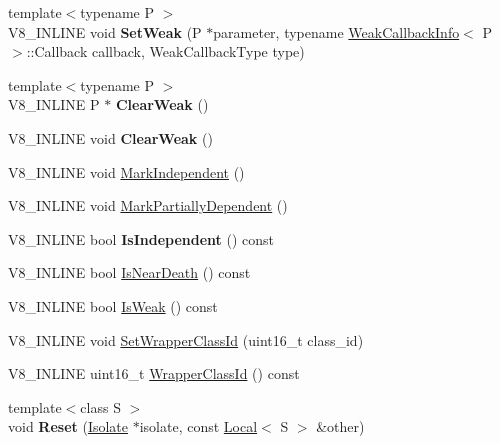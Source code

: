 \begin{DoxyCompactItemize}
\item 
\hypertarget{classv8_1_1PersistentBase_aebb8a2c97e219102f613ff3749c956f6}{}{\footnotesize template$<$typename P $>$ }\\V8\+\_\+\+I\+N\+L\+I\+N\+E void {\bfseries Set\+Weak} (P $\ast$parameter, typename \hyperlink{classv8_1_1WeakCallbackInfo}{Weak\+Callback\+Info}$<$ P $>$\+::Callback callback, Weak\+Callback\+Type type)\label{classv8_1_1PersistentBase_aebb8a2c97e219102f613ff3749c956f6}

\item 
\hypertarget{classv8_1_1PersistentBase_a444d27c00650e3663348024df08cb121}{}{\footnotesize template$<$typename P $>$ }\\V8\+\_\+\+I\+N\+L\+I\+N\+E P $\ast$ {\bfseries Clear\+Weak} ()\label{classv8_1_1PersistentBase_a444d27c00650e3663348024df08cb121}

\item 
\hypertarget{classv8_1_1PersistentBase_afe515daead108cceb1699b54051df13b}{}V8\+\_\+\+I\+N\+L\+I\+N\+E void {\bfseries Clear\+Weak} ()\label{classv8_1_1PersistentBase_afe515daead108cceb1699b54051df13b}

\item 
V8\+\_\+\+I\+N\+L\+I\+N\+E void \hyperlink{classv8_1_1PersistentBase_aed12b0a54bc5ade1fb44e3bdb3a1fe74}{Mark\+Independent} ()
\item 
V8\+\_\+\+I\+N\+L\+I\+N\+E void \hyperlink{classv8_1_1PersistentBase_a4a876d30dda0dfb812e82bb240e4686e}{Mark\+Partially\+Dependent} ()
\item 
\hypertarget{classv8_1_1PersistentBase_a2ed93b6be1b27c299906935ef35d2114}{}V8\+\_\+\+I\+N\+L\+I\+N\+E bool {\bfseries Is\+Independent} () const \label{classv8_1_1PersistentBase_a2ed93b6be1b27c299906935ef35d2114}

\item 
V8\+\_\+\+I\+N\+L\+I\+N\+E bool \hyperlink{classv8_1_1PersistentBase_a4a64c26d91ed6a276aa8a7ca4bb7683a}{Is\+Near\+Death} () const 
\item 
V8\+\_\+\+I\+N\+L\+I\+N\+E bool \hyperlink{classv8_1_1PersistentBase_a714b7794149df483837a2c6b09d52396}{Is\+Weak} () const 
\item 
V8\+\_\+\+I\+N\+L\+I\+N\+E void \hyperlink{classv8_1_1PersistentBase_ac4c979164b3ed4dc92319e6f5a108d3d}{Set\+Wrapper\+Class\+Id} (uint16\+\_\+t class\+\_\+id)
\item 
V8\+\_\+\+I\+N\+L\+I\+N\+E uint16\+\_\+t \hyperlink{classv8_1_1PersistentBase_a01a46bf4e69ed9a837639702ee234643}{Wrapper\+Class\+Id} () const 
\item 
\hypertarget{classv8_1_1PersistentBase_ab4b4d3fba3498486f1f10dc7d5be90fc}{}{\footnotesize template$<$class S $>$ }\\void {\bfseries Reset} (\hyperlink{classv8_1_1Isolate}{Isolate} $\ast$isolate, const \hyperlink{classv8_1_1Local}{Local}$<$ S $>$ \&other)\label{classv8_1_1PersistentBase_ab4b4d3fba3498486f1f10dc7d5be90fc}


\end{DoxyCompactItemize}
